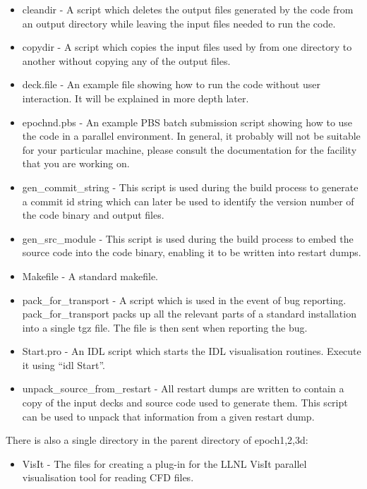 \documentclass[12pt,a4paper]{article}
\newcommand{\EPOCH}{{\color{warwickdark}\fontfamily{phv}\selectfont{EPOCH}}}
\begin{document}
\begin{itemize}
\item cleandir - A script which deletes the output files generated by the
  {\EPOCH} code from an output directory while leaving the input files needed to
  run the code.
\item copydir - A script which copies the input files used by {\EPOCH} from one
  directory to another without copying any of the output files.
\item deck.file - An example file showing how to run the code without user
  interaction. It will be explained in more depth later.
\item epoch{n}d.pbs - An example PBS batch submission script showing how to use
  the code in a parallel environment. In general, it probably will not be
  suitable for your particular machine, please consult the documentation for
  the facility that you are working on.
\item gen\_commit\_string - This script is used during the build process to
  generate a commit id string which can later be used to identify the version
  number of the code binary and output files.
\item gen\_src\_module - This script is used during the build process to
  embed the source code into the code binary, enabling it to be written into
  restart dumps.
\item Makefile - A standard makefile.
\item pack\_for\_transport - A script which is used in the event of bug
  reporting. pack\_for\_transport packs up all the relevant parts of a
  standard {\EPOCH} installation into a single tgz file. The file is then sent
  when reporting the bug.
\item Start.pro - An IDL script which starts the IDL visualisation
  routines. Execute it using ``idl Start''.
\item unpack\_source\_from\_restart - All restart dumps are written to contain
  a copy of the input decks and source code used to generate them. This script
  can be used to unpack that information from a given restart dump.
\end{itemize}

There is also a single directory in the parent directory of epoch{1,2,3}d:

\begin{itemize}
\item VisIt - The files for creating a plug-in for the LLNL VisIt parallel
  visualisation tool for reading CFD files.
\end{itemize}
\end{document}
